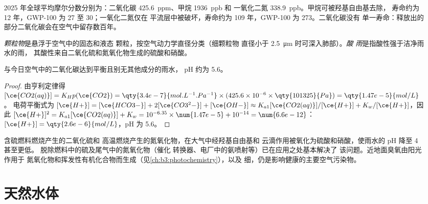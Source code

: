 2025 年全球平均摩尔分数分别为：二氧化碳 \qty{425.6}{ppm}、甲烷 \qty{1936}{ppb} 和
一氧化二氮 \qty{338.9}{ppb}。甲烷可被羟基自由基去除，
寿命约为 12 年，GWP-100 为 27 至 30；一氧化二氮仅在
平流层中被破坏，寿命约为 109 年，GWP-100 为 273。二氧化碳没有
单一寿命：释放出的部分二氧化碳会在空气中留存数百年。

\begin{definition}[空气污染物]\label{def:b3:environmental-toxicology:pollutants}
\emph{颗粒物}是悬浮于空气中的固态和液态
颗粒，按空气动力学直径分类（细颗粒物
直径小于 \qty{2.5}{\micro\metre} 时可深入肺部）。\emph{酸
雨}是指酸性强于洁净雨水的雨，
其酸性来自二氧化硫和氮氧化物生成的硫酸和硝酸。
\end{definition}

\begin{proposition}[洁净雨水的 pH]\label{prop:b3:environmental-toxicology:rain-ph}
与今日空气中的二氧化碳达到平衡且别无其他成分的雨水，
pH 约为 5.6。
\end{proposition}

\begin{proof}
由亨利定律得 $[\ce{CO2(aq)}] = K_Hp(\ce{CO2}) = \qty{3.4e-7}{mol.L^{-1}.Pa^{-1}} \times (425.6 \times 10^{-6} \times \qty{101325}{Pa}) = \qty{1.47e-5}{mol/L}$。
电荷平衡式为 $[\ce{H+}] = [\ce{HCO3-}] + 2[\ce{CO3^2-}] + [\ce{OH-}] \approx K_{a1}[\ce{CO2(aq)}]/[\ce{H+}] + K_w/[\ce{H+}]$，因此
$[\ce{H+}]^2 = K_{a1}[\ce{CO2(aq)}] + K_w = 10^{-6.35} \times \num{1.47e-5} + 10^{-14} = \num{6.6e-12}$：$[\ce{H+}] = \qty{2.6e-6}{mol/L}$，pH 为 5.6。
\end{proof}

含硫燃料燃烧产生的二氧化硫和
高温燃烧产生的氮氧化物，在大气中经羟基自由基和
云滴作用被氧化为硫酸和硝酸，使雨水的 pH 降至 4 甚至更低。
脱除燃料中的硫及尾气中的氮氧化物（催化
转换器、电厂中的氨喷射等）已在应用之处基本解决了
该问题。近地面臭氧由阳光作用于
氮氧化物和挥发性有机化合物而生成（见\cref{ch:b3:photochemistry}），以及
细，仍是影响健康的主要空气污染物。

\section{天然水体}

